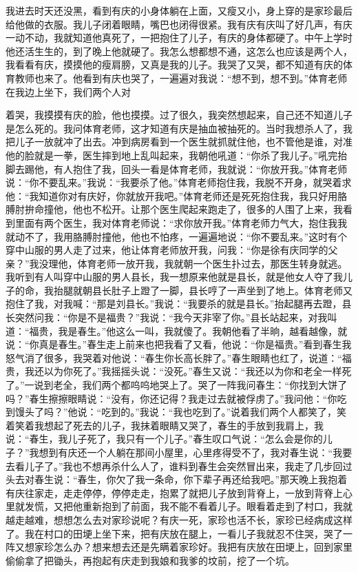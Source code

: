\documentclass[12pt,UTF8]{ctexbook}
\begin{document}
我进去时天还没黑，看到有庆的小身体躺在上面，又瘦又小，身上穿的是家珍最后给他做的衣服。我儿子闭着眼睛，嘴巴也闭得很紧。我有庆有庆叫了好几声，有庆一动不动，我就知道他真死了，一把抱住了儿子，有庆的身体都硬了。中午上学时他还活生生的，到了晚上他就硬了。我怎么想都想不通，这怎么也应该是两个人，我看看有庆，摸摸他的瘦肩膀，又真是我的儿子。我哭了又哭，都不知道有庆的体育教师也来了。他看到有庆也哭了，一遍遍对我说：“想不到，想不到。”体育老师在我边上坐下，我们两个人对


着哭，我摸摸有庆的脸，他也摸摸。过了很久，我突然想起来，自己还不知道儿子是怎么死的。我问体育老师，这才知道有庆是抽血被抽死的。当时我想杀人了，我把儿子一放就冲了出去。冲到病房看到一个医生就抓就住他，也不管他是谁，对准他的脸就是一拳，医生摔到地上乱叫起来，我朝他吼道：“你杀了我儿子。”吼完抬脚去踢他，有人抱住了我，回头一看是体育老师，我就说：“你放开我。”体育老师说：“你不要乱来。”我说：“我要杀了他。”体育老师抱住我，我脱不开身，就哭着求他：“我知道你对有庆好，你就放开我吧。”体育老师还是死死抱住我，我只好用胳膊肘拚命撞他，他也不松开。让那个医生爬起来跑走了，很多的人围了上来，我看到里面有两个医生，我对体育老师说：“求你放开我。”体育老师力气大，抱住我我就动不了，我用胳膊肘撞他，他也不怕疼，一遍遍地说：“你不要乱来。”这时有个穿中山服的男人走了过来，他让体育老师放开我，问我：“你是徐有庆同学的父亲？”我没理他，体育老师一放开我，我就朝一个医生扑过去，那医生转身就逃。我听到有人叫穿中山服的男人县长，我一想原来他就是县长，就是他女人夺了我儿子的命，我抬腿就朝县长肚子上蹬了一脚，县长哼了一声坐到了地上。体育老师又抱住了我，对我喊：“那是刘县长。”我说：“我要杀的就是县长。”抬起腿再去蹬，县长突然问我：“你是不是福贵？”我说：“我今天非宰了你。”县长站起来，对我叫道：“福贵，我是春生。”他这么一叫，我就傻了。我朝他看了半晌，越看越像，就说：“你真是春生。”春生走上前来也把我看了又看，他说：“你是福贵。”看到春生我怒气消了很多，我哭着对他说：“春生你长高长胖了。”春生眼睛也红了，说道：“福贵，我还以为你死了。”我摇摇头说：“没死。”春生又说：“我还以为你和老全一样死了。”一说到老全，我们两个都呜呜地哭上了。哭了一阵我问春生：“你找到大饼了吗？”春生擦擦眼睛说：“没有，你还记得？我走过去就被俘虏了。”我问他：“你吃到馒头了吗？”他说：“吃到的。”我说：“我也吃到了。”说着我们两个人都笑了，笑着笑着我想起了死去的儿子，我抹着眼睛又哭了，春生的手放到我肩上，我说：“春生，我儿子死了，我只有一个儿子。”春生叹口气说：“怎么会是你的儿子？”我想到有庆还一个人躺在那间小屋里，心里疼得受不了，我对春生说：“我要去看儿子了。”我也不想再杀什么人了，谁料到春生会突然冒出来，我走了几步回过头去对春生说：“春生，你欠了我一条命，你下辈子再还给我吧。”那天晚上我抱着有庆往家走，走走停停，停停走走，抱累了就把儿子放到背脊上，一放到背脊上心里就发慌，又把他重新抱到了前面，我不能不看着儿子。眼看着走到了村口，我就越走越难，想想怎么去对家珍说呢？有庆一死，家珍也活不长，家珍已经病成这样了。我在村口的田埂上坐下来，把有庆放在腿上，一看儿子我就忍不住哭，哭了一阵又想家珍怎么办？想来想去还是先瞒着家珍好。我把有庆放在田埂上，回到家里偷偷拿了把锄头，再抱起有庆走到我娘和我爹的坟前，挖了一个坑。
\end{document}
